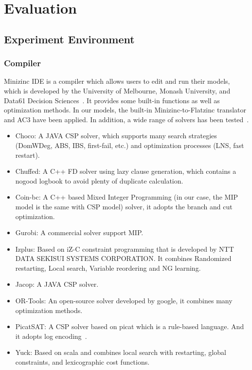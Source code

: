 \chapter{Evaluation}
\label{cha:evaluation}
\section{Experiment Environment}
\subsection{Compiler}
\label{section:compiler}
Minizinc IDE is a compiler which allows users to edit and run their models, which is developed by the University of Melbourne, Monash University, and Data61 Decision Sciences~\cite{r6}. It provides some built-in functions as well as optimization methods. In our models, the built-in Minizinc-to-Flatzinc translator and AC3 have been applied. In addition, a wide range of solvers has been tested~\cite{r6}.
\begin{itemize}
    \item Choco: A JAVA CSP solver, which supports many search strategies (DomWDeg, ABS, IBS, first-fail, etc.) and optimization processes (LNS, fast restart).
    \item Chuffed: A C++ FD solver using lazy clause generation, which contains a nogood logbook to avoid plenty of duplicate calculation.
    \item Coin-bc: A C++ based Mixed Integer Programming (in our case, the MIP model is the same with CSP model) solver, it adopts the branch and cut optimization.
    \item Gurobi: A commercial solver support MIP.
    \item Izplus: Based on iZ-C constraint programming that is developed by NTT DATA SEKISUI SYSTEMS CORPORATION. It combines Randomized restarting, Local search, Variable reordering and NG learning.
    \item Jacop: A JAVA CSP solver.
    \item OR-Tools: An open-source solver developed by google, it combines many optimization methods.
    \item PicatSAT: A CSP solver based on picat which is a rule-based language. And it adopts log encoding~\cite{r8}.
    \item Yuck: Based on scala and combines local search with restarting, global constraints, and lexicographic cost functions.
\end{itemize}
